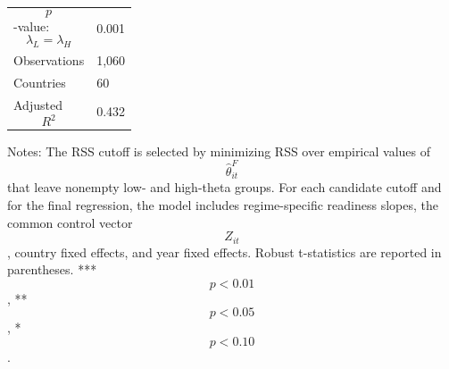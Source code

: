 \begin{table}[H]
\begin{threeparttable}
\begin{tabularx}{\textwidth}{lY}
$$p$$-value: $$\lambda_L=\lambda_H$$ & 0.001 \\
Observations & 1,060 \\
Countries & 60 \\
Adjusted $$R^2$$ & 0.432 \\
\bottomrule
\end{tabularx}
\begin{tablenotes}[flushleft]\footnotesize
\item Notes: The RSS cutoff is selected by minimizing RSS over empirical values of $$\widehat{\theta}^{F}_{it}$$ that leave nonempty low- and high-theta groups. For each candidate cutoff and for the final regression, the model includes regime-specific readiness slopes, the common control vector $$Z_{it}$$, country fixed effects, and year fixed effects. Robust t-statistics are reported in parentheses. *** $$p<0.01$$, ** $$p<0.05$$, * $$p<0.10$$.
\end{tablenotes}
\end{threeparttable}
\end{table}

